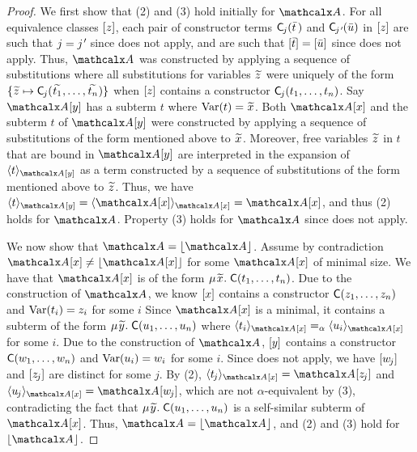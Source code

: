 \begin{rep}
\begin{proof}
We first show that (2) and (3) hold initially for $\Val$.
For all equivalence classes $[z]$,
each pair of constructor terms $\textsf{C}_{\kern-0.083333em j}( \bar t \,)$ and $\const{C}_{\negvthinspace\jPrime}( \vec u )$ in $[z]$
are such that $j = \jPrime$ since  does not apply, %
and are such that $[ \bar t ] = [ \bar u ]$ since  does not apply. %
Thus,
$\Val$ was constructed by applying a sequence of substitutions
where all substitutions for variables ${\Varec{z}}$
were uniquely of the form $\{ {\Varec{z}} \mapsto \const{C}_{\negvthinspace j}( {\Varec{t_1}}, \ldots, {\Varec{t_n}} ) \}$
when $[z]$ contains a constructor $\textsf{C}_{\kern-0.083333em j}( t_1, \ldots, t_n )$.
Say $\Val \ec{y}$ has a subterm $t$ where $\muvar(t) = {\Varec{x}}$.
Both $\Val \ec{x}$ and the subterm $t$ of $\Val \ec{y}$ were
constructed by applying a sequence of substitutions of the form mentioned above to ${\Varec{x}}$.
Moreover, free variables ${\Varec{z}}$ in $t$ that are bound in $\Val \ec{y}$ are interpreted in
the expansion of $\expand{\Val \ec{y}}{ t }$ as a term
constructed by a sequence of substitutions of the form mentioned above to ${\Varec{z}}$. %
Thus, we have
$\expand{\Val \ec{y}}{ t } = \expand{\Val \ec{x}}{ \Val \ec{x} } = \Val \ec{x}$, and thus (2) holds for $\Val$.
Property (3) holds for $\Val$ since  does not apply.

We now show that $\Val = \nf{\Val}$.
Assume by contradiction $\Val \ec{x} \neq \nf{\Val \ec{x}}$ for some $\Val \ec{x}$ of minimal size.
We have that $\Val \ec{x}$ is of the form $\MU {\Varec{x}}.\; \const{C}( t_1, \ldots, t_n )$.
Due to the construction of $\Val$,
we know $[x]$ contains a constructor $\textsf{C}( z_1, \ldots, z_n )$ and $\mathrm{Var}( t_i ) = z_i$ for some $i$ %
Since $\Val \ec{x}$ is a minimal, it
contains a subterm of the form $\MU {\Varec{y}}.\; \const{C}( u_1, \ldots, u_n )$
where $\expand{\Val \ec{x}}{ t_i } \aequiv \expand{\Val \ec{x} }{ u_i }$ for some $i$. %
Due to the construction of $\Val$, $[y]$ contains a constructor $\textsf{C}( w_1, \ldots, w_n )$ and $\mathrm{Var}( u_i ) = w_i$ for some $i$. %
Since  does not apply, %
we have $[w_{\kern-0.083333em j}]$ and $[z_{\kern-0.083333em j}]$ are distinct for some $j$.
By (2), $\expand{\Val \ec{x}}{ t_{\negvthinspace j} } = \Val \ec{z_{\negvthinspace j}}$
and $\expand{\Val \ec{x}}{ u_{\negvthinspace j} } = \Val \ec{w_{\negvthinspace j}}$,
which are not $\alpha$-equivalent by (3), contradicting the fact that $\MU {\Varec{y}}.\; \const{C}( u_1, \ldots, u_n )$ is a self-similar subterm of $\Val \ec{x}$.
Thus, $\Val = \nf{\Val}$, and (2) and (3) hold for $\nf{\Val}$.


\end{proof}
\end{rep}

